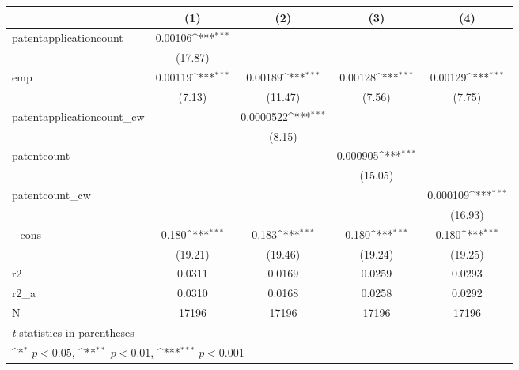 {
\def\sym#1{\ifmmode^{#1}\else\(^{#1}\)\fi}
\begin{tabular}{l*{4}{c}}
\hline\hline
            &\multicolumn{1}{c}{(1)}         &\multicolumn{1}{c}{(2)}         &\multicolumn{1}{c}{(3)}         &\multicolumn{1}{c}{(4)}         \\
\hline
patentapplicationcount&     0.00106\sym{***}&                     &                     &                     \\
            &     (17.87)         &                     &                     &                     \\
[1em]
emp         &     0.00119\sym{***}&     0.00189\sym{***}&     0.00128\sym{***}&     0.00129\sym{***}\\
            &      (7.13)         &     (11.47)         &      (7.56)         &      (7.75)         \\
[1em]
patentapplicationcount\_cw&                     &   0.0000522\sym{***}&                     &                     \\
            &                     &      (8.15)         &                     &                     \\
[1em]
patentcount &                     &                     &    0.000905\sym{***}&                     \\
            &                     &                     &     (15.05)         &                     \\
[1em]
patentcount\_cw&                     &                     &                     &    0.000109\sym{***}\\
            &                     &                     &                     &     (16.93)         \\
[1em]
\_cons      &       0.180\sym{***}&       0.183\sym{***}&       0.180\sym{***}&       0.180\sym{***}\\
            &     (19.21)         &     (19.46)         &     (19.24)         &     (19.25)         \\
\hline
r2          &      0.0311         &      0.0169         &      0.0259         &      0.0293         \\
r2\_a        &      0.0310         &      0.0168         &      0.0258         &      0.0292         \\
N           &       17196         &       17196         &       17196         &       17196         \\
\hline\hline
\multicolumn{5}{l}{\footnotesize \textit{t} statistics in parentheses}\\
\multicolumn{5}{l}{\footnotesize \sym{*} \(p<0.05\), \sym{**} \(p<0.01\), \sym{***} \(p<0.001\)}\\
\end{tabular}
}
